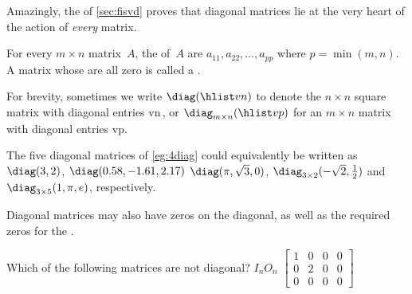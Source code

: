 Amazingly, the  of \cref{sec:fisvd} proves that diagonal matrices lie at the very heart of the action of \emph{every} matrix.

\begin{definition} \label{def:diag} 
For every \(m\times n\) matrix~\(A\), the  of~\(A\) are \(a_{11},a_{22},\ldots,a_{pp}\) where \(p=\min(m,n)\).
A matrix whose  are all zero is called a .

For brevity, sometimes we write \(\diag(\hlist vn)\) to denote the \(n\times n\) square matrix with diagonal entries \hlist vn\,, or \(\diag_{m\times n}(\hlist vp)\) for an \(m\times n\) matrix with diagonal entries \hlist vp.
\end{definition}

\begin{example}  \sloppy
The five diagonal matrices of \cref{eg:4diag} could equivalently be written as \(\diag(3,2)\), \(\diag(0.58,-1.61,2.17)\) \(\diag(\pi,\sqrt3,0)\), \(\diag_{3\times2}(-\sqrt2,\tfrac12)\) and \(\diag_{3\times5}(1,\pi,e)\), respectively.
\end{example}


Diagonal matrices may also have zeros on the diagonal, as well as the 
required zeros for the .


\begin{activity}
Which of the following matrices are not diagonal?
{\(I_n\)}{\(O_n\)}
{\(\begin{bmatrix} 1&0&0&0
\\0&2&0&0
\\0&0&0&0 \end{bmatrix}\)}
\end{activity}
  



